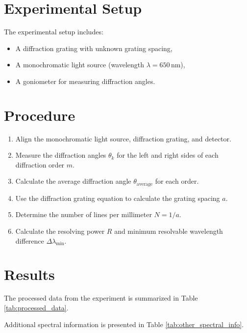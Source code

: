\documentclass[journal]{IEEEtran}
\begin{document}
\section{Experimental Setup}
The experimental setup includes:
\begin{itemize}
    \item A diffraction grating with unknown grating spacing,
    \item A monochromatic light source (wavelength $\lambda = 650 \, \text{nm}$),
    \item A goniometer for measuring diffraction angles.
\end{itemize}

\section{Procedure}
\begin{enumerate}
    \item Align the monochromatic light source, diffraction grating, and detector.
    \item Measure the diffraction angles $\theta_k$ for the left and right sides of each diffraction order $m$.
    \item Calculate the average diffraction angle $\theta_{\text{average}}$ for each order.
    \item Use the diffraction grating equation to calculate the grating spacing $a$.
    \item Determine the number of lines per millimeter $N = 1/a$.
    \item Calculate the resolving power $R$ and minimum resolvable wavelength difference $\Delta\lambda_{\text{min}}$.
\end{enumerate}

\section{Results}
The processed data from the experiment is summarized in Table \ref{tab:processed_data}.

Additional spectral information is presented in Table \ref{tab:other_spectral_info}.
\end{document}
